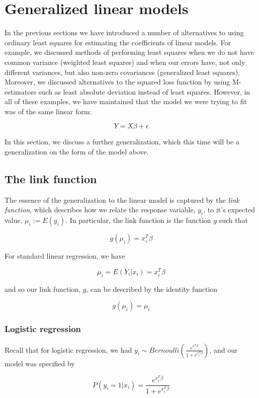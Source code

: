 
\chapter{Generalized linear models}
\label{ch:glms}




In the previous sections we have introduced a number of alternatives to using ordinary least squares for estimating the coefficients of linear models. For example, we discussed methods of performing least squares when we do not have common variance (weighted least squares) and when our errors have, not only different variances, but also non-zero covariances (generalized least squares). Moreover, we discussed alternatives to the squared loss function by using M-estimators such as least absolute deviation instead of least squares. However, in all of these examples, we have maintained that the model we were trying to fit was of the same linear form:

$$Y = X \beta + \epsilon$$

In this section, we discuss a further generalization, which this time will be a generalization on the form of the model above. 

\section{The link function}

The essence of the generalization to the linear model is captured by the \textit{link function}, which describes how we relate the response variable, $y_i$, to it's expected value, $\mu_i := E(y_i)$. In particular, the link function is the function $g$ such that

$$g(\mu_i) = x_i^T \beta$$

For standard linear regression, we have

$$\mu_i = E(Y_i | x_i) = x_i^T\beta$$

and so our link function, $g$, can be described by the identity function

$$g(\mu_i) = \mu_i$$

\subsection*{Logistic regression}

Recall that for logistic regression, we had $y_i \sim Bernoulli\left( \frac{e^{x_i^T\beta}}{1 + e^{x_i^T\beta}}\right)$, and our model was specified by

$$P(y_i = 1 |x_i) = \frac{e^{x_i^T\beta}}{1 + e^{x_i^T \beta}}$$

